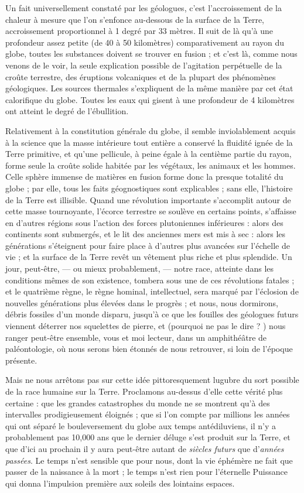 \documentclass[a4paper, 11pt, oneside]{article}
\begin{document}
Un fait universellement constaté par les géologues, c'est l'accroissement de la chaleur à mesure que l'on s'enfonce au-dessous de la surface de la Terre, accroissement proportionnel à 1 degré par 33 mètres. Il suit de là qu'à une profondeur assez petite (de 40 à 50 kilomètres) comparativement au rayon du globe, toutes les substances doivent se trouver en fusion ; et c'est là, comme nous venons de le voir, la seule explication possible de l'agitation perpétuelle de la croûte terrestre, des éruptions volcaniques et de la plupart des phénomènes géologiques. Les sources thermales s'expliquent de la même manière par cet état calorifique du globe. Toutes les eaux qui gisent à une profondeur de 4 kilomètres ont atteint le degré de l'ébullition.

Relativement à la constitution générale du globe, il semble inviolablement acquis à la science que la masse intérieure tout entière a conservé la fluidité ignée de la Terre primitive, et qu'une pellicule, à peine égale à la centième partie du rayon, forme seule la croûte solide habitée par les végétaux, les animaux et les hommes. Celle sphère immense de matières en fusion forme donc la presque totalité du globe ; par elle, tous les faits géognostiques sont explicables ; sans elle, l'histoire de la Terre est illisible. Quand une révolution importante s'accomplit autour de cette masse tournoyante, l'écorce terrestre se soulève en certains points, s'affaisse en d'autres régions sous l'action des forces plutoniennes inférieures : alors des continents sont submergés, et le lit des anciennes mers est mis à sec : alors les générations s'éteignent pour faire place à d'autres plus avancées sur l'échelle de vie ; et la surface de la Terre revêt un vêtement plus riche et plus splendide. Un jour, peut-être, --- ou mieux probablement, --- notre race, atteinte dans les conditions mêmes de son existence, tombera sous une de ces révolutions fatales ; et le quatrième règne, le règne hominal, intellectuel, sera marqué par l'éclosion de nouvelles générations plus élevées dans le progrès ; et nous, nous dormirons, débris fossiles d'un monde disparu, jusqu'à ce que les fouilles des géologues futurs viennent déterrer nos squelettes de pierre, et (pourquoi ne pas le dire ? ) nous ranger peut-être ensemble, vous et moi lecteur, dans un amphithéâtre de paléontologie, où nous serons bien étonnés de nous retrouver, si loin de l'époque présente.

Mais ne nous arrêtons pas sur cette idée pittoresquement lugubre du sort possible de la race humaine sur la Terre. Proclamons au-dessus d'elle cette vérité plus certaine : que les grandes catastrophes du monde ne se montrent qu'à des intervalles prodigieusement éloignés ; que si l'on compte par millions les années qui ont séparé le bouleversement du globe aux temps antédiluviens, il n'y a probablement pas 10,000 ans que le dernier déluge s'est produit sur la Terre, et que d'ici au prochain il y aura peut-être autant de \emph{siècles futurs} que d'\emph{années passées}. Le temps n'est sensible que pour nous, dont la vie éphémère ne fait que passer de la naissance à la mort ; le temps n'est rien pour l'éternelle Puissance qui donna l'impulsion première aux soleils des lointains espaces.
\clearpage
\end{document}

